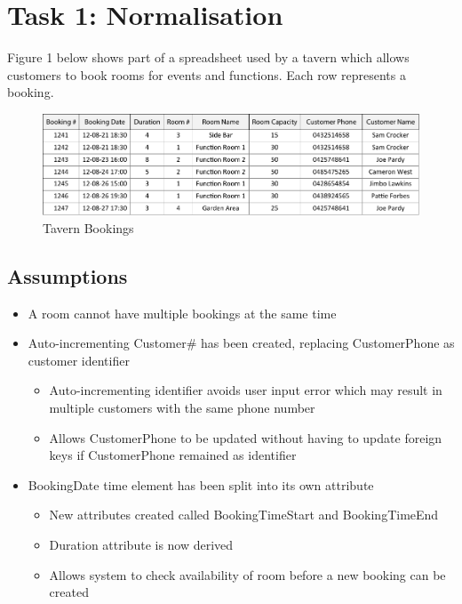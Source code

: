 \section{Task 1: Normalisation}

Figure 1 below shows part of a spreadsheet used by a tavern which allows customers to book rooms for events and functions. Each row represents a booking.

\begin{figure}[H]
\centering
\caption{Tavern Bookings}
\includegraphics[scale=1]{./img/task1.pdf}
\end{figure}

\subsection*{Assumptions}

\begin{itemize}
\item A room cannot have multiple bookings at the same time
\item Auto-incrementing Customer\# has been created, replacing CustomerPhone as customer identifier
	\begin{itemize}
	\item Auto-incrementing identifier avoids user input error which may result in multiple customers with the same phone number
	\item Allows CustomerPhone to be updated without having to update foreign keys if CustomerPhone remained as identifier
	\end{itemize}
\item BookingDate time element has been split into its own attribute
	\begin{itemize}
	\item New attributes created called BookingTimeStart and BookingTimeEnd
	\item Duration attribute is now derived
	\item Allows system to check availability of room before a new booking can be created
	\end{itemize}
\end{itemize}

